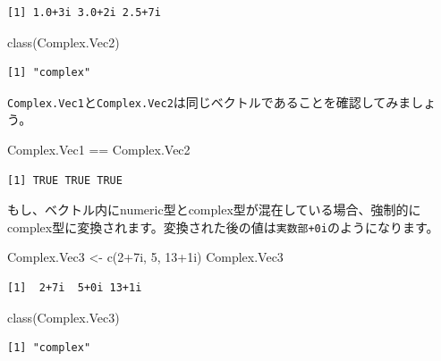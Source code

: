 \documentclass[
  a4paper,
  pandoc,
  ja=standard,
  jafont=haranoaji]{bxjsbook}
\newenvironment{Shaded}{\begin{snugshade}}{\end{snugshade}}
\newcommand{\DecValTok}[1]{\textcolor[rgb]{0.68,0.00,0.00}{#1}}
\newcommand{\FunctionTok}[1]{\textcolor[rgb]{0.28,0.35,0.67}{#1}}
\newcommand{\NormalTok}[1]{\textcolor[rgb]{0.00,0.48,0.65}{#1}}
\newcommand{\OtherTok}[1]{\textcolor[rgb]{0.00,0.48,0.65}{#1}}
\newcommand{\SpecialCharTok}[1]{\textcolor[rgb]{0.37,0.37,0.37}{#1}}
\begin{document}
\begin{verbatim}
[1] 1.0+3i 3.0+2i 2.5+7i
\end{verbatim}

\begin{Shaded}
\begin{Highlighting}[numbers=left,,]
\FunctionTok{class}\NormalTok{(Complex.Vec2)}
\end{Highlighting}
\end{Shaded}

\begin{verbatim}
[1] "complex"
\end{verbatim}

\texttt{Complex.Vec1}と\texttt{Complex.Vec2}は同じベクトルであることを確認してみましょう。

\begin{Shaded}
\begin{Highlighting}[numbers=left,,]
\NormalTok{Complex.Vec1 }\SpecialCharTok{==}\NormalTok{ Complex.Vec2}
\end{Highlighting}
\end{Shaded}

\begin{verbatim}
[1] TRUE TRUE TRUE
\end{verbatim}

もし、ベクトル内にnumeric型とcomplex型が混在している場合、強制的にcomplex型に変換されます。変換された後の値は\texttt{実数部+0i}のようになります。

\begin{Shaded}
\begin{Highlighting}[numbers=left,,]
\NormalTok{Complex.Vec3 }\OtherTok{\textless{}{-}} \FunctionTok{c}\NormalTok{(}\DecValTok{2}\SpecialCharTok{+}\NormalTok{7i, }\DecValTok{5}\NormalTok{, }\DecValTok{13}\SpecialCharTok{+}\NormalTok{1i)}
\NormalTok{Complex.Vec3}
\end{Highlighting}
\end{Shaded}

\begin{verbatim}
[1]  2+7i  5+0i 13+1i
\end{verbatim}

\begin{Shaded}
\begin{Highlighting}[numbers=left,,]
\FunctionTok{class}\NormalTok{(Complex.Vec3)}
\end{Highlighting}
\end{Shaded}

\begin{verbatim}
[1] "complex"
\end{verbatim}
\end{document}
